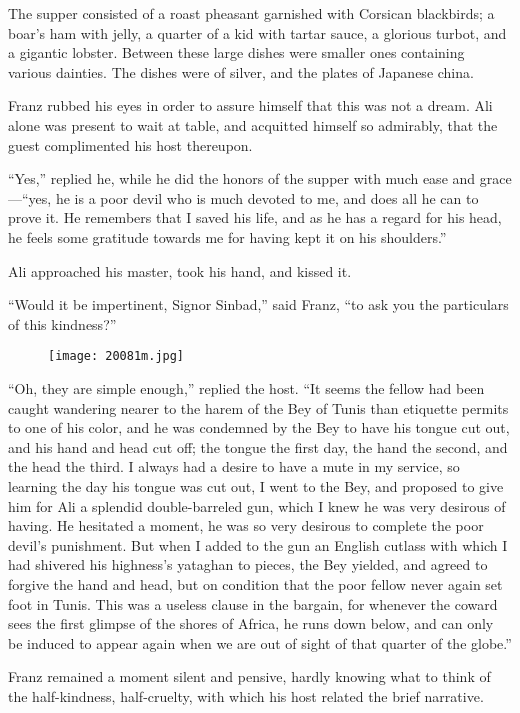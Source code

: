 The supper consisted of a roast pheasant garnished with Corsican
blackbirds; a boar’s ham with jelly, a quarter of a kid with tartar
sauce, a glorious turbot, and a gigantic lobster. Between these large
dishes were smaller ones containing various dainties. The dishes were
of silver, and the plates of Japanese china.

Franz rubbed his eyes in order to assure himself that this was not a
dream. Ali alone was present to wait at table, and acquitted himself so
admirably, that the guest complimented his host thereupon.

“Yes,” replied he, while he did the honors of the supper with much ease
and grace—“yes, he is a poor devil who is much devoted to me, and does
all he can to prove it. He remembers that I saved his life, and as he
has a regard for his head, he feels some gratitude towards me for
having kept it on his shoulders.”

Ali approached his master, took his hand, and kissed it.

“Would it be impertinent, Signor Sinbad,” said Franz, “to ask you the
particulars of this kindness?”

\begin{figure}[ht]
\texttt{[image: 20081m.jpg]}
\end{figure}

“Oh, they are simple enough,” replied the host. “It seems the fellow
had been caught wandering nearer to the harem of the Bey of Tunis than
etiquette permits to one of his color, and he was condemned by the Bey
to have his tongue cut out, and his hand and head cut off; the tongue
the first day, the hand the second, and the head the third. I always
had a desire to have a mute in my service, so learning the day his
tongue was cut out, I went to the Bey, and proposed to give him for Ali
a splendid double-barreled gun, which I knew he was very desirous of
having. He hesitated a moment, he was so very desirous to complete the
poor devil’s punishment. But when I added to the gun an English cutlass
with which I had shivered his highness’s yataghan to pieces, the Bey
yielded, and agreed to forgive the hand and head, but on condition that
the poor fellow never again set foot in Tunis. This was a useless
clause in the bargain, for whenever the coward sees the first glimpse
of the shores of Africa, he runs down below, and can only be induced to
appear again when we are out of sight of that quarter of the globe.”

Franz remained a moment silent and pensive, hardly knowing what to
think of the half-kindness, half-cruelty, with which his host related
the brief narrative.

